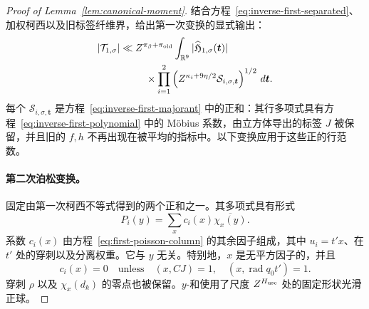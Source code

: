 \documentclass[11pt,a4paper]{article}
\numberwithin{equation}{section}
\numberwithin{figure}{section}
\theoremstyle{definition}
\theoremstyle{remark}
\begin{document}
\begin{proof}[Proof of Lemma~\ref{lem:canonical-moment}]
结合方程~\eqref{eq:inverse-first-separated}、加权柯西以及旧标签纤维界，给出第一次变换的显式输出：
\begin{equation}\label{eq:inverse-first-transform-output}
 \begin{split}
 |\mathcal T_{1,\sigma}|\ll{}&Z^{\pi_\beta+\pi_{\rm old}}
 \int_{\mathbb R^9}|\widehat{\mathfrak H}_{1,\sigma}(\boldsymbol t)|\\
 &\quad\times\prod_{i=1}^2
 \left(Z^{\kappa_i+9\eta/2}\mathcal S_{i,\sigma,\boldsymbol t}\right)^{1/2}
 \,d\boldsymbol t.
 \end{split}
\end{equation}
每个 \(\mathcal S_{i,\sigma,\boldsymbol t}\) 是方程~\eqref{eq:inverse-first-majorant} 中的正和：其行多项式具有方程~\eqref{eq:inverse-first-polynomial} 中的 M\"obius 系数，由立方体导出的标签 \(J\) 被保留，并且旧的 \(f,h\) 不再出现在被平均的指标中。以下变换应用于这些正的行范数。

\paragraph{第二次泊松变换。}
固定由第一次柯西不等式得到的两个正和之一。其多项式具有形式
\[
 P_i(y)=\sum_x c_i(x)\overline{\chi_x(y)}.
\]
系数 \(c_i(x)\) 由方程~\eqref{eq:first-poisson-column} 的其余因子组成，其中 \(u_i=t'x\)、在 \(t'\) 处的穿刺以及分离权重。它与 \(y\) 无关。特别地，\(x\) 是无平方因子的，并且
\[
 c_i(x)=0\quad\text{unless}\quad
 (x,CJ)=1,\quad (x,\operatorname{rad}q_0t')=1.
\]
穿刺 \(\rho\) 以及 \(\chi_x(d_k)\) 的零点也被保留。\(y\)-和使用了尺度 \(Z^{H_{\rm use}}\) 处的固定形状光滑正球。


\end{proof}
\end{document}
